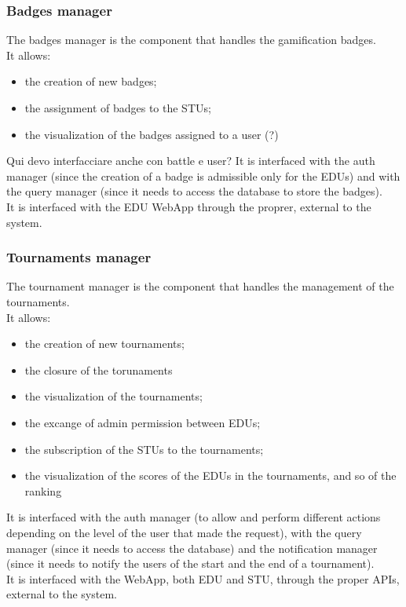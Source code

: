 \subsubsection*{Badges manager}
The badges manager is the component that handles the gamification badges.\\
It allows:
\begin{itemize}
    \item the creation of new badges;
    \item the assignment of badges to the STUs;
    \item the visualization of the badges assigned to a user (?)
\end{itemize}
{\color{red}Qui devo interfacciare anche con battle e user?}
It is interfaced with the auth manager (since the creation of a badge is admissible only for the EDUs) and with the query manager (since it needs to access the database to store the badges).\\
It is interfaced with the EDU WebApp through the proprer, external to the system.

\subsubsection*{Tournaments manager}
The tournament manager is the component that handles the management of the tournaments.\\
It allows:
\begin{itemize}
    \item the creation of new tournaments;
    \item the closure of the torunaments
    \item the visualization of the tournaments;
    \item the excange of admin permission between EDUs;
    \item the subscription of the STUs to the tournaments;
    \item the visualization of the scores of the EDUs in the tournaments, and so of the ranking
\end{itemize}
It is interfaced with the auth manager (to allow and perform different actions depending on the level of the user that made the request), with the query manager (since it needs to access the database) and the notification manager (since it needs to notify the users of the start and the end of a tournament).\\
It is interfaced with the WebApp, both EDU and STU, through the proper APIs, external to the system.


